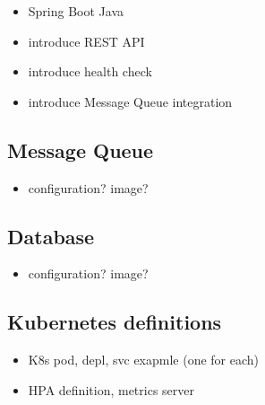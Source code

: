 \begin{itemize}
	\item Spring Boot Java
	\item introduce REST API
	\item introduce health check
	\item introduce Message Queue integration
\end{itemize}

\subsection{Message Queue}

\begin{itemize}
	\item configuration? image?
\end{itemize}

\subsection{Database}

\begin{itemize}
	\item configuration? image?
\end{itemize}


\subsection{Kubernetes definitions}


\begin{itemize}
	\item K8s pod, depl, svc exapmle (one for each)
	\item HPA definition, metrics server
\end{itemize}
















